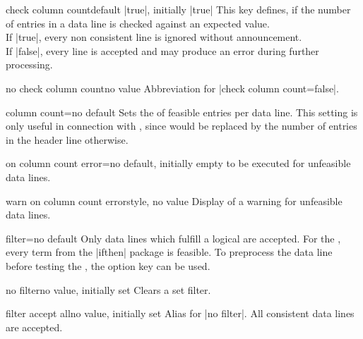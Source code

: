 \documentclass[a4paper,11pt]{ltxdoc}
\begin{document}
\begin{docCsvKey}{check column count}{}{default |true|, initially |true|}
  This key defines, if the number of entries in a data line is checked against
  an expected value.\\
  If |true|, every non consistent line is ignored without announcement.\\
  If |false|, every line is accepted and may produce an error during
  further processing.
\end{docCsvKey}


\begin{docCsvKey}{no check column count}{}{no value}
  Abbreviation for |check column count=false|.
\end{docCsvKey}


\begin{docCsvKey}{column count}{=}{no default}
  Sets the  of feasible entries per data line.
  This setting is only useful in connection with ,
  since  would be replaced by the number of entries in the
  header line otherwise.
\end{docCsvKey}


\begin{docCsvKey}{on column count error}{=}{no default, initially empty}
   to be executed for unfeasible data lines.
\end{docCsvKey}


\begin{docCsvKey}{warn on column count error}{}{style, no value}
  Display of a warning for unfeasible data lines.
\end{docCsvKey}


\begin{docCsvKey}{filter}{=}{no default}
  Only data lines which fulfill a logical  are accepted.
  For the , every term from the |ifthen| package \cite{carlisle:2001b}
  is feasible.
  To preprocess the data line before testing the ,
  the option key  can be used.
\end{docCsvKey}

\begin{docCsvKey}{no filter}{}{no value, initially set}
  Clears a set filter.
\end{docCsvKey}


\begin{docCsvKey}{filter accept all}{}{no value, initially set}
  Alias for |no filter|. All consistent data lines are accepted.
\end{docCsvKey}
\end{document}
